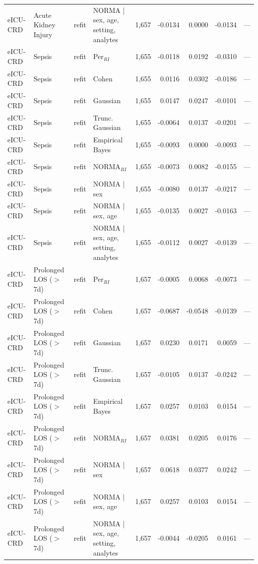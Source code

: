 \begin{table}[ht]
\begin{tabular}{ll l l r r r r r}
eICU-CRD & Acute Kidney Injury & refit & NORMA | sex, age, setting, analytes & 1,657 & -0.0134 & 0.0000 & -0.0134 & --- \\
eICU-CRD & Sepsis & refit & Per$_{RI}$ & 1,655 & -0.0118 & 0.0192 & -0.0310 & --- \\
eICU-CRD & Sepsis & refit & Cohen & 1,655 & 0.0116 & 0.0302 & -0.0186 & --- \\
eICU-CRD & Sepsis & refit & Gaussian & 1,655 & 0.0147 & 0.0247 & -0.0101 & --- \\
eICU-CRD & Sepsis & refit & Trunc. Gaussian & 1,655 & -0.0064 & 0.0137 & -0.0201 & --- \\
eICU-CRD & Sepsis & refit & Empirical Bayes & 1,655 & -0.0093 & 0.0000 & -0.0093 & --- \\
eICU-CRD & Sepsis & refit & NORMA$_{RI}$ & 1,655 & -0.0073 & 0.0082 & -0.0155 & --- \\
eICU-CRD & Sepsis & refit & NORMA | sex & 1,655 & -0.0080 & 0.0137 & -0.0217 & --- \\
eICU-CRD & Sepsis & refit & NORMA | sex, age & 1,655 & -0.0135 & 0.0027 & -0.0163 & --- \\
eICU-CRD & Sepsis & refit & NORMA | sex, age, setting, analytes & 1,655 & -0.0112 & 0.0027 & -0.0139 & --- \\
eICU-CRD & Prolonged LOS ($>$7d) & refit & Per$_{RI}$ & 1,657 & -0.0005 & 0.0068 & -0.0073 & --- \\
eICU-CRD & Prolonged LOS ($>$7d) & refit & Cohen & 1,657 & -0.0687 & -0.0548 & -0.0139 & --- \\
eICU-CRD & Prolonged LOS ($>$7d) & refit & Gaussian & 1,657 & 0.0230 & 0.0171 & 0.0059 & --- \\
eICU-CRD & Prolonged LOS ($>$7d) & refit & Trunc. Gaussian & 1,657 & -0.0105 & 0.0137 & -0.0242 & --- \\
eICU-CRD & Prolonged LOS ($>$7d) & refit & Empirical Bayes & 1,657 & 0.0257 & 0.0103 & 0.0154 & --- \\
eICU-CRD & Prolonged LOS ($>$7d) & refit & NORMA$_{RI}$ & 1,657 & 0.0381 & 0.0205 & 0.0176 & --- \\
eICU-CRD & Prolonged LOS ($>$7d) & refit & NORMA | sex & 1,657 & 0.0618 & 0.0377 & 0.0242 & --- \\
eICU-CRD & Prolonged LOS ($>$7d) & refit & NORMA | sex, age & 1,657 & 0.0257 & 0.0103 & 0.0154 & --- \\
eICU-CRD & Prolonged LOS ($>$7d) & refit & NORMA | sex, age, setting, analytes & 1,657 & -0.0044 & -0.0205 & 0.0161 & --- \\

\end{tabular}
\end{table}
